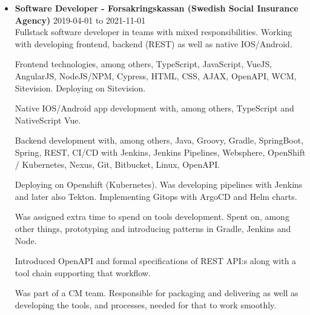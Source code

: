 \documentclass[a4paper]{article}
\begin{document}
\begin{itemize}
  \item \textbf{Software Developer - Forsakringskassan (Swedish Social Insurance Agency)} 2019-04-01 to 2021-11-01 \\

  Fullstack software developer in teams with mixed responsibilities. Working with developing frontend, backend (REST) as well as native IOS/Android.

  Frontend technologies, among others, TypeScript, JavaScript, VueJS, AngularJS, NodeJS/NPM, Cypress, HTML, CSS, AJAX, OpenAPI, WCM, Sitevision. Deploying on Sitevision.

  Native IOS/Android app development with, among others, TypeScript and NativeScript Vue.
  
  Backend development with, among others, Java, Groovy, Gradle, SpringBoot, Spring, REST, CI/CD with Jenkins, Jenkins Pipelines, Websphere, OpenShift / Kubernetes, Nexus, Git, Bitbucket, Linux, OpenAPI.

  Deploying on Openshift (Kubernetes). Was developing pipelines with Jenkins and later also Tekton. Implementing Gitops with ArgoCD and Helm charts.

  Was assigned extra time to spend on tools development. Spent on, among other things, prototyping and introducing patterns in Gradle, Jenkins and Node.
  
  Introduced OpenAPI and formal specifications of REST API:s along with a tool chain supporting that workflow.
  
  Was part of a CM team. Responsible for packaging and delivering as well as developing the tools, and processes, needed for that to work smoothly.
\end{itemize}
  
\end{document}
